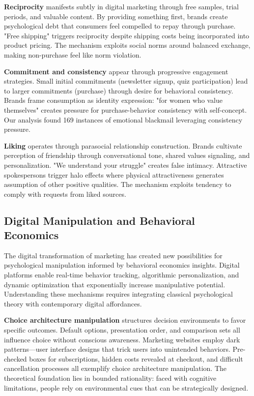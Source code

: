 \textbf{Reciprocity} manifests subtly in digital marketing through free samples, trial periods, and valuable content. By providing something first, brands create psychological debt that consumers feel compelled to repay through purchase. "Free shipping" triggers reciprocity despite shipping costs being incorporated into product pricing. The mechanism exploits social norms around balanced exchange, making non-purchase feel like norm violation.

\textbf{Commitment and consistency} appear through progressive engagement strategies. Small initial commitments (newsletter signup, quiz participation) lead to larger commitments (purchase) through desire for behavioral consistency. Brands frame consumption as identity expression: "for women who value themselves" creates pressure for purchase-behavior consistency with self-concept. Our analysis found 169 instances of emotional blackmail leveraging consistency pressure.

\textbf{Liking} operates through parasocial relationship construction. Brands cultivate perception of friendship through conversational tone, shared values signaling, and personalization. "We understand your struggle" creates false intimacy. Attractive spokespersons trigger halo effects where physical attractiveness generates assumption of other positive qualities. The mechanism exploits tendency to comply with requests from liked sources.

\subsection{Digital Manipulation and Behavioral Economics}

The digital transformation of marketing has created new possibilities for psychological manipulation informed by behavioral economics insights. Digital platforms enable real-time behavior tracking, algorithmic personalization, and dynamic optimization that exponentially increase manipulative potential. Understanding these mechanisms requires integrating classical psychological theory with contemporary digital affordances.

\textbf{Choice architecture manipulation} structures decision environments to favor specific outcomes. Default options, presentation order, and comparison sets all influence choice without conscious awareness. Marketing websites employ dark patterns—user interface designs that trick users into unintended behaviors. Pre-checked boxes for subscriptions, hidden costs revealed at checkout, and difficult cancellation processes all exemplify choice architecture manipulation. The theoretical foundation lies in bounded rationality: faced with cognitive limitations, people rely on environmental cues that can be strategically designed.

